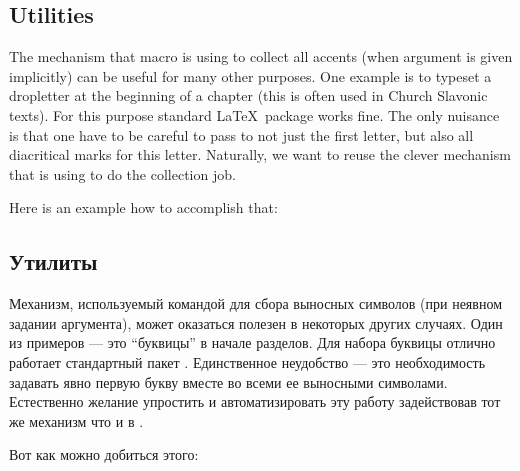 \begin{EN}
\section{Utilities}
The mechanism that  macro is using to collect all accents (when argument is given implicitly) can be useful for
many other purposes. One example is to typeset a dropletter at the beginning of a chapter (this is often used in Church Slavonic
texts). For this purpose standard \LaTeX\ package  works fine. The only nuisance is that one have to be careful to
pass to  not just the first letter, but also all diacritical marks for this letter. Naturally, we want to reuse the
clever mechanism that  is using to do the collection job.

Here is an example how to accomplish that:
\end{EN}

\begin{RU}
\section{Утилиты}
Механизм, используемый командой  для сбора выносных символов (при неявном задании аргумента), может оказаться полезен
в некоторых других случаях. Один из примеров --- это ``буквицы'' в начале разделов. Для набора буквицы отлично работает стандартный
пакет . Единственное неудобство --- это необходимость задавать явно первую букву вместе во всеми ее выносными символами.
Естественно желание упростить и автоматизировать эту работу задействовав тот же механизм что и в .

Вот как можно добиться этого:
\end{RU}

